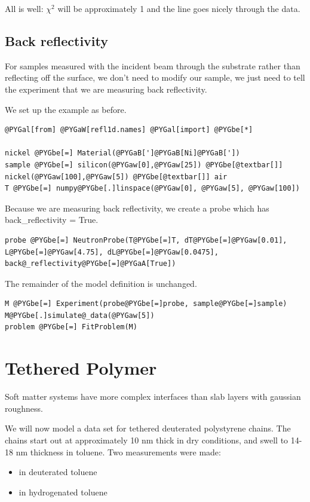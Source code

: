 \documentclass[letterpaper,10pt,english]{sphinxmanual}
\begin{document}
All is well: $\chi^2$ will be approximately 1 and the line goes nicely
through the data.


\subsection{Back reflectivity}
\label{examples/ex1/nifilm-back:back-reflectivity}\label{examples/ex1/nifilm-back::doc}
For samples measured with the incident beam through the substrate rather
than reflecting off the surface, we don't need to modify our sample, we
just need to tell the experiment that we are measuring back reflectivity.

We set up the example as before.

\begin{Verbatim}[commandchars=@\[\]]
@PYGal[from] @PYGaW[refl1d.names] @PYGal[import] @PYGbe[*]

nickel @PYGbe[=] Material(@PYGaB[']@PYGaB[Ni]@PYGaB['])
sample @PYGbe[=] silicon(@PYGaw[0],@PYGaw[25]) @PYGbe[@textbar[]] nickel(@PYGaw[100],@PYGaw[5]) @PYGbe[@textbar[]] air
T @PYGbe[=] numpy@PYGbe[.]linspace(@PYGaw[0], @PYGaw[5], @PYGaw[100])
\end{Verbatim}

Because we are measuring back reflectivity, we create a probe which has
back\_reflectivity = True.

\begin{Verbatim}[commandchars=@\[\]]
probe @PYGbe[=] NeutronProbe(T@PYGbe[=]T, dT@PYGbe[=]@PYGaw[0.01], L@PYGbe[=]@PYGaw[4.75], dL@PYGbe[=]@PYGaw[0.0475], back@_reflectivity@PYGbe[=]@PYGaA[True])
\end{Verbatim}

The remainder of the model definition is unchanged.

\begin{Verbatim}[commandchars=@\[\]]
M @PYGbe[=] Experiment(probe@PYGbe[=]probe, sample@PYGbe[=]sample)
M@PYGbe[.]simulate@_data(@PYGaw[5])
problem @PYGbe[=] FitProblem(M)
\end{Verbatim}


\section{Tethered Polymer}
\label{examples/polymer/readme::doc}\label{examples/polymer/readme:tethered-polymer}
Soft matter systems have more complex interfaces than slab layers with
gaussian roughness.

We will now model a data set for tethered deuterated polystyrene chains.
The chains start out at approximately 10 nm thick in dry conditions, and
swell to 14-18 nm thickness in toluene.  Two measurements were made:
\begin{itemize}
\item {} 
 in deuterated toluene

\item {} 
  in hydrogenated toluene

\end{itemize}
\end{document}
